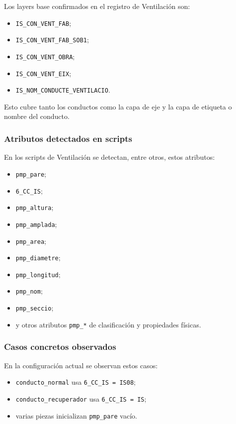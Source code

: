 Los layers base confirmados en el registro de Ventilación son:

\begin{itemize}
\item \texttt{IS\_CON\_VENT\_FAB};
\item \texttt{IS\_CON\_VENT\_FAB\_SOB1};
\item \texttt{IS\_CON\_VENT\_OBRA};
\item \texttt{IS\_CON\_VENT\_EIX};
\item \texttt{IS\_NOM\_CONDUCTE\_VENTILACIO}.
\end{itemize}

Esto cubre tanto los conductos como la capa de eje y la capa de etiqueta o nombre del conducto.


\subsubsection{Atributos detectados en scripts}

En los scripts de Ventilación se detectan, entre otros, estos atributos:

\begin{itemize}
\item \texttt{pmp\_pare};
\item \texttt{6\_CC\_IS};
\item \texttt{pmp\_altura};
\item \texttt{pmp\_amplada};
\item \texttt{pmp\_area};
\item \texttt{pmp\_diametre};
\item \texttt{pmp\_longitud};
\item \texttt{pmp\_nom};
\item \texttt{pmp\_seccio};
\item y otros atributos \texttt{pmp\_*} de clasificación y propiedades físicas.
\end{itemize}

\subsubsection{Casos concretos observados}

En la configuración actual se observan estos casos:

\begin{itemize}
\item \texttt{conducto\_normal} usa \texttt{6\_CC\_IS = IS08};
\item \texttt{conducto\_recuperador} usa \texttt{6\_CC\_IS = IS};
\item varias piezas inicializan \texttt{pmp\_pare} vacío.
\end{itemize}

